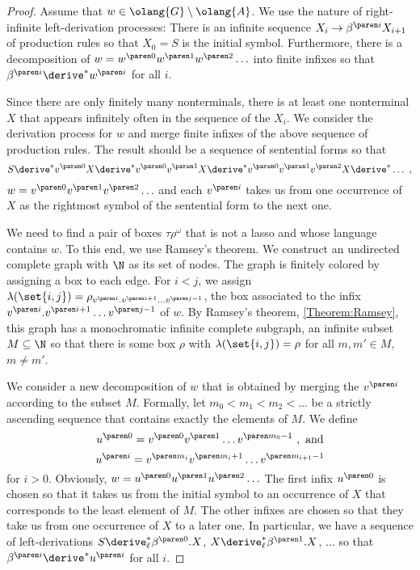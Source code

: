 \documentclass[../../diss.tex]{subfiles}
\begin{document}
\begin{proof}
    Assume that $w \in \olang{G} \setminus \olang{A}$.
    We use the nature of right-infinite left-derivation processes:
    There is an infinite sequence $X_i \to \itr{\beta}{i} X_{i+1}$ of production rules so that $X_0 = S$ is the initial symbol.
    Furthermore, there is a decomposition of $w = \itr{w}{0}\itr{w}{1}\itr{w}{2} \ldots$ into finite infixes so that $\itr{\beta}{i} \derive^* \itr{w}{i}$ for all $i$.

    Since there are only finitely many nonterminals, there is at least one nonterminal $X$ that appears infinitely often in the sequence of the $X_i$.
    We consider the derivation process for $w$ and merge finite infixes of the above sequence of production rules.
    The result should be a sequence of sentential forms so that
    \[
        S \derive^*
        \itr{v}{0} X
        \derive^*
        \itr{v}{0}\itr{v}{1} X
        \derive^*
        \itr{v}{0}\itr{v}{1}\itr{v}{2}X
        \derive^* \ldots
        \ ,
    \]
    \ie  $w = \itr{v}{0}\itr{v}{1}\itr{v}{2} \ldots$ and each $\itr{v}{i}$ takes us from one occurrence of $X$ as the rightmost symbol of the sentential form to the next one.

    We need to find a pair of boxes $\tau\rho^\omega$ that is not a lasso and whose language contains $w$.
    To this end, we use Ramsey's theorem.
    We construct an undirected complete graph with $\N$ as its set of nodes.
    The graph is finitely colored by assigning a box to each edge.
    For $i < j$, we assign $\lambda(\set{i,j}) = \tbox{\itr{v}{i}.\itr{v}{i+1} \ldots \itr{v}{j-1} }$, the box associated to the infix $\itr{v}{i}.\itr{v}{i+1} \ldots \itr{v}{j-1}$ of $w$.
    By Ramsey's theorem, \cref{Theorem:Ramsey}, this graph has a monochromatic infinite complete subgraph, \ie an infinite subset $M \subseteq \N$ so that there is some box $\rho$ with $\lambda(\set{i,j}) = \rho$ for all $m,m' \in M$, $m \neq m'$.

    We consider a new decomposition of $w$ that is obtained by merging the $\itr{v}{i}$ according to the subset $M$.
    Formally, let $m_0 < m_1 < m_2 < \ldots$ be a strictly ascending sequence that contains exactly the elements of $M$.
    We define
    \[
        \itr{u}{0} = \itr{v}{0} \itr{v}{1} \ldots \itr{v}{m_0 - 1}
        \ , \text{ and}
    \]
    \[
        \itr{u}{i} = \itr{v}{m_i} \itr{v}{m_i + 1} \ldots \itr{v}{m_{i+1} - 1}
    \]
    for $i > 0$.
    Obviously, $w = \itr{u}{0} \itr{u}{1} \itr{u}{2} \ldots$%
    The first infix $\itr{u}{0}$ is chosen so that it takes us from the initial symbol to an occurrence of $X$ that corresponds to the least element of $M$.
    The other infixes are chosen so that they take us from one occurrence of $X$ to a later one.
    In particular, we have a sequence of left-derivations $S \leftderive^* \itr{\beta}{0}.X$, $X \leftderive^* \itr{\beta}{1}.X$, $\ldots$ so that $\itr{\beta}{i} \derive^* \itr{u}{i}$ for all $i$.


\end{proof}
\end{document}

